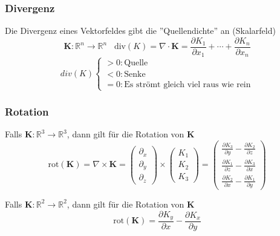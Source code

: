 \documentclass[8pt, a4paper, landscape, fleqn]{scrartcl}
\begin{document}
\begin{multicols*}{3}
				\subsubsection{Divergenz}
					Die Divergenz eines Vektorfeldes gibt die ''Quellendichte'' an (Skalarfeld)
					\begin{equation*}
						\textbf{K}: \mathbb{R}^n \rightarrow \mathbb{R}^n \hspace{10pt} \text{div}(K)=\nabla \cdot \textbf{K}=\frac{\partial K_1}{\partial x_1}+ \cdots +\frac{\partial K_n}{\partial x_n}
					\end{equation*}
					\begin{equation*}
					div(K) \begin{cases}
    							> 0: \text{Quelle}\\
    							< 0: \text{Senke}\\
    							= 0: \text{Es strömt gleich viel raus wie rein}
    						\end{cases}
					 \end{equation*}
				\subsubsection{Rotation}
					Falls $\textbf{K}:\mathbb{R}^3 \rightarrow \mathbb{R}^3$, dann gilt für die Rotation von $\textbf{K}$\\
					\begin{equation*}
						\text{rot}(\textbf{K})=\nabla \times \textbf{K}=
						\begin{pmatrix}
							\partial_x\\
							\partial_y\\
							\partial_z
						\end{pmatrix}
						\times
						\begin{pmatrix}
							K_1\\ K_2\\ K_3
						\end{pmatrix}
						=
						\begin{pmatrix}
							\frac{\partial K_3}{\partial y} - \frac{\partial K_2}{\partial z}\\[5pt]
							\frac{\partial K_1}{\partial z} - \frac{\partial K_3}{\partial x}\\[5pt]
							\frac{\partial K_2}{\partial x} - \frac{\partial K_1}{\partial y}
						\end{pmatrix}
					\end{equation*}
					
					Falls $\textbf{K}:\mathbb{R}^2 \rightarrow \mathbb{R}^2$, dann gilt für die Rotation von $\textbf{K}$\\
					\begin{equation*}
						\text{rot}(\textbf{K})= \frac{\partial K_y}{\partial x} -\frac{\partial K_x}{\partial y}
					\end{equation*}
					\vspace{-10pt}
					

\end{multicols*}
\end{document}
